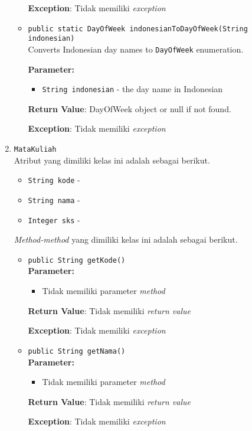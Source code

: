 \documentclass{article}
\begin{document}
\begin{enumerate}
\begin{itemize}
\textbf{Exception}: Tidak memiliki \textit{exception}

\item \texttt{public static DayOfWeek indonesianToDayOfWeek(String indonesian)}\\ 
Converts Indonesian day names to \texttt{DayOfWeek} enumeration.

\textbf{Parameter:}
\begin{itemize}
\item \texttt{String indonesian} - 
the day name in Indonesian
\end{itemize}
\textbf{Return Value}: DayOfWeek object or null if not found.

\textbf{Exception}: Tidak memiliki \textit{exception}

\end{itemize}
\item \texttt{MataKuliah}\\ 


Atribut yang dimiliki kelas ini adalah sebagai berikut.
\begin{itemize}
\item \texttt{String kode} - 
\item \texttt{String nama} - 
\item \texttt{Integer sks} - 
\end{itemize}
\textit{Method-method} yang dimiliki kelas ini adalah sebagai berikut.
\begin{itemize}
\item \texttt{public String getKode()}\\ 


\textbf{Parameter:}\begin{itemize}
\item Tidak memiliki parameter \textit{method}
\end{itemize}
\textbf{Return Value}: Tidak memiliki \textit{return value}

\textbf{Exception}: Tidak memiliki \textit{exception}

\item \texttt{public String getNama()}\\ 


\textbf{Parameter:}\begin{itemize}
\item Tidak memiliki parameter \textit{method}
\end{itemize}
\textbf{Return Value}: Tidak memiliki \textit{return value}

\textbf{Exception}: Tidak memiliki \textit{exception}


\end{itemize}
\end{enumerate}
\end{document}
